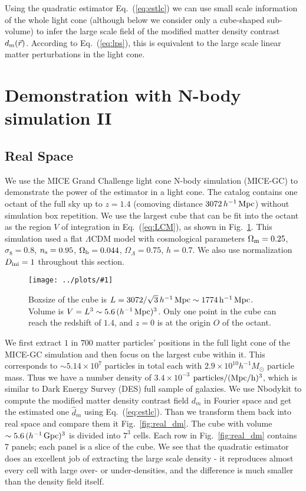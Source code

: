\documentclass[prd,amsmath,amssymb,floatfix,superscriptaddress,nofootinbib,twocolumn]{revtex4-1}
\newcommand{\ini}{\rm ini}
\newcommand{\vrr}{\vec{r}}
\newcommand{\vk}{\vec{k}}
\newcommand{\ec}[1]{Eq.~(\ref{eq:#1})}
\newcommand{\rf}[1]{\ref{fig:#1}}
\newcommand{\sfig}[2]{
\texttt{[image: ../plots/\#1]}
        }
\newcommand{\Sfig}[2]{
   \begin{figure}[thbp]
   \begin{center}
    \sfig{../plots/#1.pdf}{\columnwidth}
    \caption{{\small #2}}
    \label{fig:#1}
     \end{center}
   \end{figure}
}
\begin{document}
Using the quadratic estimator \ec{estlc} we can use small scale information of the whole light cone (although below we consider only a cube-shaped sub-volume) to infer the large scale field of the modified matter density contrast $d_{\rm m}(\vrr)$. According to \ec{lps}, this is equivalent to the large scale linear matter perturbations in the light cone.

\section{Demonstration with N-body simulation II} \label{sec6}
\subsection{Real Space}
\noindent We use the MICE Grand Challenge light cone N-body simulation (MICE-GC) to demonstrate the power of the estimator in a light cone. The catalog contains one octant of the full sky up to $z = 1.4$ (comoving distance $3072\, h^{-1}\, \rm Mpc$) without simulation box repetition. We use the largest cube that can be fit into the octant as the region $V$ of integration in \ec{LCM}, as shown in Fig.~\rf{Cube}. This simulation used a flat $\Lambda$CDM model with cosmological parameters $ \Omega_{\rm m}=0.25$, $\sigma_8 = 0.8$, $n_{\rm s}=0.95$, $\Omega_{\rm b}=0.044$, $\Omega_{\Lambda}=0.75$, $h=0.7$. We also use normalization $D_{\ini}=1$ throughout this section. 

\Sfig{Cube}{Boxsize of the cube is $L=3072/\sqrt{3}\, h^{-1}\, \rm Mpc\sim 1774\, h^{-1}\, \rm Mpc$. Volume is $V=L^3\sim 5.6\,(h^{-1}\,\rm Mpc)^3$. Only one point in the cube can reach the redshift of $1.4$, and $z=0$ is at the origin $O$ of the octant.}

We first extract $1$ in $700$  matter particles' positions in the full light cone of the MICE-GC simulation and then focus on the largest cube within it. This corresponds to $\sim 5.14\times 10^{7}$ particles in total each with $2.9\times 10^{10} h^{-1}M_{\odot}$ particle mass. Thus we have a number density of $3.4\times 10^{-3}$ $\rm particles/(Mpc/h)^3$, which is similar to Dark Energy Survey (DES) \cite{DES:2016DES} full sample of galaxies. We use Nbodykit \cite{Hand:2018nby} to compute the modified matter density contrast field $d_m$ in Fourier space and get the estimated one $\hat d_m$ using \ec{estlc}. Than we transform them back into real space and compare them it Fig.~\rf{real_dm}. The cube with volume $\sim5.6\,(h^{-1}\,\rm Gpc)^3$ is divided into $7^3$ cells. Each row in Fig.~\rf{real_dm} contains 7 panels; each panel is a slice of the cube. We see that the quadratic estimator does an excellent job of extracting the large scale density - it reproduces almost every cell with large over- or under-densities, and the difference is much smaller than the density field itself.
\end{document}
